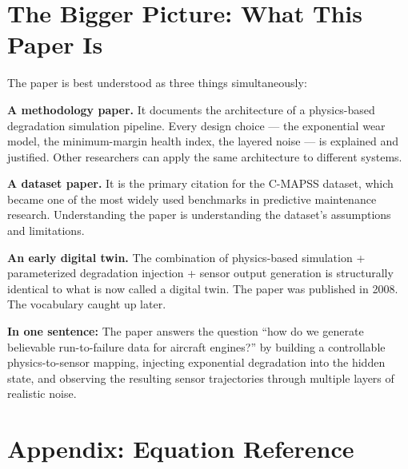 \documentclass[11pt, a4paper]{article}
\begin{document}
\section{The Bigger Picture: What This Paper Is}

The paper is best understood as three things simultaneously:

\textbf{A methodology paper.} It documents the architecture of a
physics-based degradation simulation pipeline. Every design choice ---
the exponential wear model, the minimum-margin health index, the
layered noise --- is explained and justified. Other researchers can
apply the same architecture to different systems.

\textbf{A dataset paper.} It is the primary citation for the C-MAPSS
dataset, which became one of the most widely used benchmarks in
predictive maintenance research. Understanding the paper is
understanding the dataset's assumptions and limitations.

\textbf{An early digital twin.} The combination of physics-based
simulation + parameterized degradation injection + sensor output
generation is structurally identical to what is now called a
digital twin. The paper was published in 2008. The vocabulary
caught up later.

\begin{keybox}
\textbf{In one sentence:}
The paper answers the question ``how do we generate believable
run-to-failure data for aircraft engines?'' by building a
controllable physics-to-sensor mapping, injecting exponential
degradation into the hidden state, and observing the resulting
sensor trajectories through multiple layers of realistic noise.
\end{keybox}

\section*{Appendix: Equation Reference}
\end{document}
